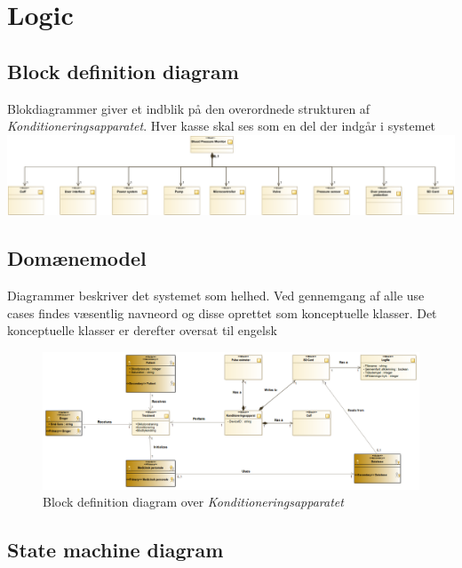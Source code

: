 \newpage
\section{Logic}

\subsection{Block definition diagram}
Blokdiagrammer giver et indblik på den overordnede strukturen af \textit{Konditioneringsapparatet}.  Hver kasse skal ses som en del der indgår i systemet \\
\includegraphics[width=\textwidth]{pdfs/BD-crop.pdf}

\subsection{Domænemodel}
Diagrammer beskriver det systemet som helhed. Ved gennemgang af alle use cases findes væsentlig navneord og disse oprettet som konceptuelle klasser. Det konceptuelle klasser er derefter oversat til engelsk \\
\begin{figure}[H]
	\includegraphics[width=\textwidth]{pdfs/DomainModel.png}
	\caption{Block definition diagram over \textit{Konditioneringsapparatet}}
\end{figure}


\newpage
\subsection{State machine diagram}
